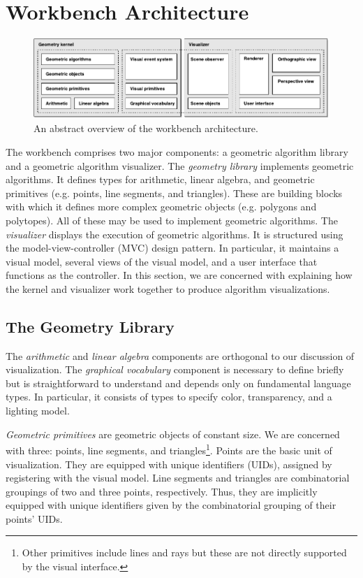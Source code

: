 
\FloatBarrier
\section{Workbench Architecture}
\label{sec:workbench-architecture}

\begin{figure}[htb]
\centering
\includegraphics[width=\textwidth]{figures/components-uml-4} 
\caption{An abstract overview of the workbench architecture.}
\label{fig:components} 
\end{figure}

The workbench comprises two major components: a geometric algorithm library and
a geometric algorithm visualizer. The \emph{geometry library} implements
geometric algorithms. It defines types for arithmetic, linear algebra, and
geometric primitives (e.g. points, line segments, and triangles). These are
building blocks with which it defines more complex geometric objects (e.g.
polygons and polytopes). All of these may be used to implement geometric
algorithms. The \emph{visualizer} displays the execution of geometric
algorithms. It is structured using the model-view-controller (MVC) design
pattern. In particular, it maintains a visual model, several views of the visual
model, and a user interface that functions as the controller. In this section,
we are concerned with explaining how the kernel and visualizer work together to
produce algorithm visualizations.

\FloatBarrier
\subsection{The Geometry Library}

The \emph{arithmetic} and \emph{linear algebra} components are orthogonal to our
discussion of visualization. The \emph{graphical vocabulary} component is
necessary to define briefly but is straightforward to understand and depends
only on fundamental language types. In particular, it consists of types to
specify color, transparency, and a lighting model.

\emph{Geometric primitives} are geometric objects of constant size. We are
concerned with three: points, line segments, and triangles\footnote{Other
primitives include lines and rays but these are not directly supported by the
visual interface.}. Points are the basic unit of visualization. They are
equipped with unique identifiers (UIDs), assigned by registering with the visual
model. Line segments and triangles are combinatorial groupings of two and three
points, respectively. Thus, they are implicitly equipped with unique identifiers
given by the combinatorial grouping of their points' UIDs.

